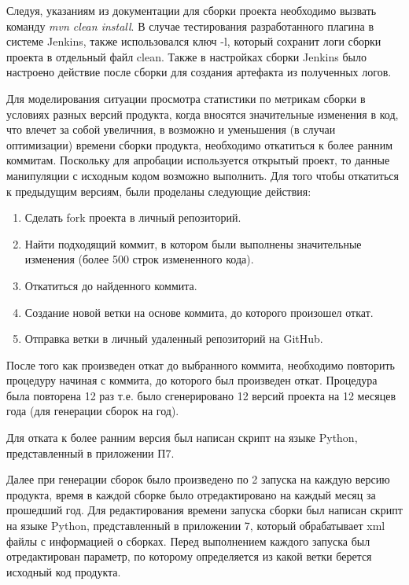 Следуя, указаниям из документации для сборки проекта необходимо вызвать команду \textit{mvn clean install}. В случае тестирования разработанного плагина  в системе Jenkins, также использовался ключ -l, который сохранит логи сборки проекта в отдельный файл clean. Также в настройках сборки Jenkins было настроено действие после сборки для создания артефакта из полученных логов.

Для моделирования ситуации просмотра статистики по метрикам сборки в условиях разных версий продукта, когда вносятся значительные изменения в код, что влечет за собой увеличния, в возможно и уменьшения (в случаи оптимизации) времени сборки продукта, необходимо откатиться к более ранним коммитам. Поскольку для апробации используется открытый проект, то данные манипуляции с исходным кодом возможно выполнить. Для того чтобы откатиться к предыдущим версиям, были проделаны следующие действия:

\begin{enumerate}
	\item Сделать fork проекта в личный репозиторий.
	
	\item Найти подходящий коммит, в котором были выполнены значительные изменения (более 500 строк измененного кода).
	
	\item Откатиться до найденного коммита.
	
	\item Создание новой ветки на основе коммита, до которого произошел откат.
	
	\item Отправка ветки в личный удаленный репозиторий на GitHub.
	
\end{enumerate}

После того как произведен откат до выбранного коммита, необходимо повторить процедуру начиная с коммита, до которого был произведен откат. Процедура была повторена 12 раз т.е. было сгенерировано 12 версий проекта на 12 месяцев года (для генерации сборок на год).

Для отката к более ранним версия был написан скрипт на языке Python, представленный в приложении П7.

Далее при генерации сборок было произведено по 2 запуска на каждую версию продукта, время в каждой сборке было отредактировано на каждый месяц за прошедший год. Для редактирования времени запуска сборки был написан скрипт на языке Python, представленный в приложении 7, который обрабатывает xml файлы с информацией о сборках. Перед выполнением каждого запуска был отредактирован параметр, по которому определяется из какой ветки берется исходный код продукта.

